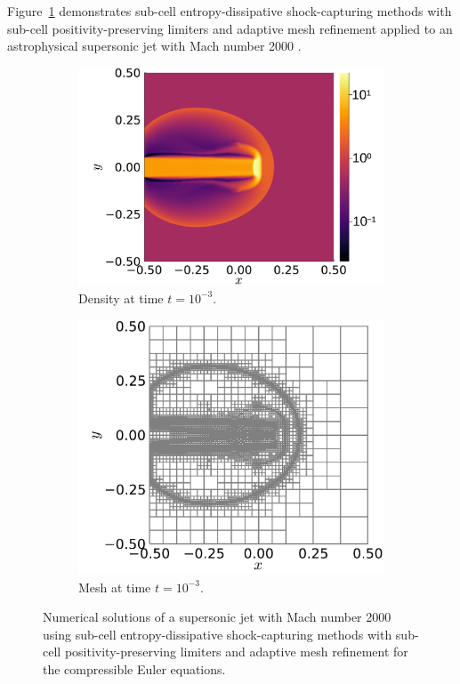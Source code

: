 \documentclass[hidelinks]{juliacon} %
\begin{document}
Figure~\ref{fig:jet} demonstrates sub-cell entropy-dissipative shock-capturing
methods with sub-cell positivity-preserving limiters and adaptive mesh refinement applied
to an astrophysical supersonic jet with Mach number 2000 \cite{liu2021oscillation}.
\begin{figure}[!h]
  \begin{subfigure}{0.53\linewidth}
    \includegraphics[width=\textwidth]{../figures/jet_density}
    \caption{Density at time $t = 10^{-3}$.}
  \end{subfigure}%
  \hspace*{\fill}
  \begin{subfigure}{0.47\linewidth}
    \includegraphics[width=\textwidth]{../figures/jet_mesh}
    \caption{Mesh at time $t = 10^{-3}$.}
  \end{subfigure}%
  \caption{Numerical solutions of a supersonic jet with Mach number 2000 using
           sub-cell entropy-dissipative shock-capturing methods with sub-cell positivity-preserving
           limiters and adaptive mesh refinement for the compressible Euler equations.}
  \label{fig:jet}
\end{figure}
\end{document}
